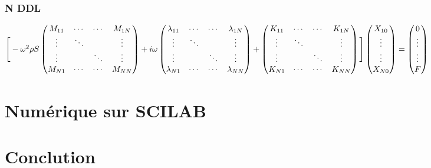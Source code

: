 \documentclass[a4paper,10pt]{report} %
\begin{document}
\subsection{N DDL}
$ \Bigg[
- \omega^2 \rho S \begin{pmatrix}
   M_{11} &\cdots&\cdots&M_{1N} \\
   \vdots & \ddots &&\vdots\\
   \vdots &&\ddots&\vdots\\
   M_{N1}  &\cdots&\cdots&M_{NN}
\end{pmatrix}
+ i \omega \begin{pmatrix}
	\lambda_{11} &\cdots&\cdots&\lambda_{1N} \\
   \vdots & \ddots &&\vdots\\
   \vdots &&\ddots&\vdots\\
   \lambda_{N1}  &\cdots&\cdots&\lambda_{NN}
\end{pmatrix}
+ \begin{pmatrix}
	K_{11} &\cdots&\cdots&K_{1N} \\
   \vdots & \ddots &&\vdots\\
   \vdots &&\ddots&\vdots\\
   K_{N1}  &\cdots&\cdots&K_{NN}
\end{pmatrix} \Bigg]\\
\begin{pmatrix}
	X_{10} \\
	\vdots\\
	\vdots\\
	X_{N0}
\end{pmatrix}
= \begin{pmatrix}
	0 \\
	\vdots\\
	\vdots\\
	F
\end{pmatrix}
$


\chapter{Numérique sur SCILAB}









\chapter{Conclution}
\end{document}
